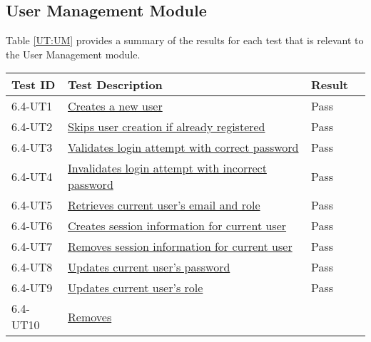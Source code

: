 \documentclass[12pt, titlepage]{article}
\begin{document}
\subsection{User Management Module}
Table \ref{UT:UM} provides a summary of the results for each test that is
relevant to the User Management module.
\begin{table}[H]
  \centering
  \begin{tabular}{|l|l|l|l|}
    \hline
    \textbf{Test ID} & \textbf{Test Description} & \textbf{Result}\\
    \hline
    6.4-UT1 &
    \href{https://github.com/SumanyaG/Alkalytics/blob/main/src/backend/test/userServiceTest.py}{Creates
    a new user} & Pass\\
    \hline
    6.4-UT2 &
    \href{https://github.com/SumanyaG/Alkalytics/blob/main/src/backend/test/userServiceTest.py}{Skips
    user creation if already registered} & Pass\\
    \hline
    6.4-UT3 &
    \href{https://github.com/SumanyaG/Alkalytics/blob/main/src/backend/test/userServiceTest.py}{Validates
    login attempt with correct password} & Pass \\
    \hline
    6.4-UT4 &
    \href{https://github.com/SumanyaG/Alkalytics/blob/main/src/backend/test/userServiceTest.py}{Invalidates
    login attempt with incorrect password} & Pass\\
    \hline
    6.4-UT5 &
    \href{https://github.com/SumanyaG/Alkalytics/blob/main/src/backend/test/userServiceTest.py}{Retrieves
    current user's email and role} & Pass \\
    \hline
    6.4-UT6 &
    \href{https://github.com/SumanyaG/Alkalytics/blob/main/src/backend/test/userServiceTest.py}{Creates
    session information for current user} & Pass\\
    \hline
    6.4-UT7 &
    \href{https://github.com/SumanyaG/Alkalytics/blob/main/src/backend/test/userServiceTest.py}{Removes
    session information for current user} & Pass\\
    \hline
    6.4-UT8 &
    \href{https://github.com/SumanyaG/Alkalytics/blob/main/src/backend/test/userServiceTest.py}{Updates
    current user's password} & Pass\\
    \hline
    6.4-UT9 &
    \href{https://github.com/SumanyaG/Alkalytics/blob/main/src/backend/test/userServiceTest.py}{Updates
    current user's role} & Pass\\
    \hline
    6.4-UT10 &
    \href{https://github.com/SumanyaG/Alkalytics/blob/main/src/backend/test/userServiceTest.py}{Removes
}
\end{tabular}
\end{table}
\end{document}
